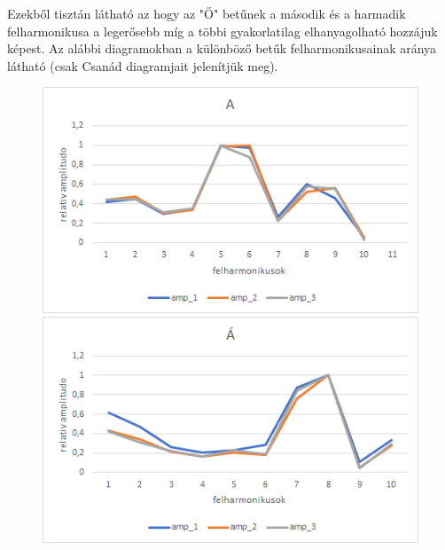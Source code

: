 \documentclass[a4paper,12pt]{article}
\begin{document}
Ezekből tisztán látható az hogy az "Ő" betűnek a második és a harmadik felharmonikusa a legerősebb míg a többi gyakorlatilag elhanyagolható hozzájuk képest. Az alábbi diagramokban a különböző betűk felharmonikusainak aránya látható (csak Csanád diagramjait jelenítjük meg).
\begin{figure}[h!]
\centering
\begin{minipage}{.5\textwidth}
  \centering
  \includegraphics[width=.9\linewidth]{A.png}
\end{minipage}%
\begin{minipage}{.5\textwidth}
  \centering
  \includegraphics[width=.9\linewidth]{A_1.png}
\end{minipage}
\end{figure}
\end{document}
